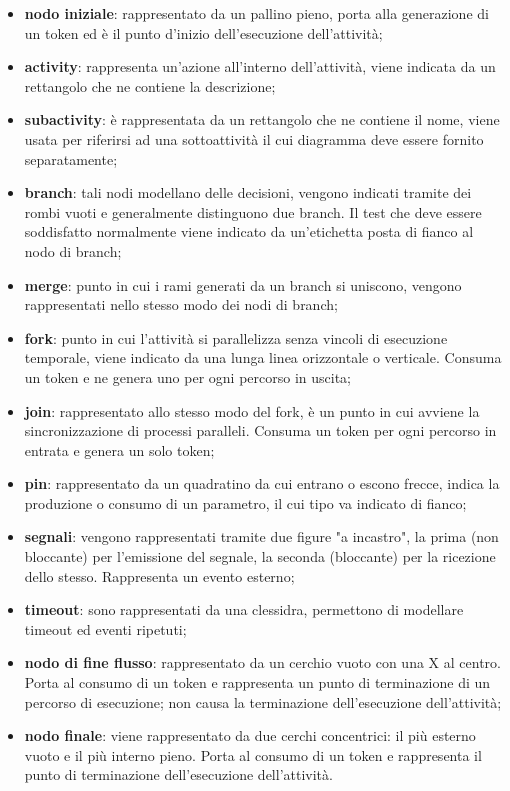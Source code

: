     	\begin{itemize}
    		\item{\textbf{nodo iniziale}}: rappresentato da un pallino pieno, porta alla generazione di un token ed è il punto d'inizio dell'esecuzione dell'attività; 
    		\item{\textbf{activity}}: rappresenta un'azione all'interno dell'attività, viene indicata  da un rettangolo che ne contiene la descrizione; 
    		\item{\textbf{subactivity}}: è rappresentata da un rettangolo che ne contiene il nome, viene usata per riferirsi ad una sottoattività il cui diagramma deve essere fornito separatamente; 
    		\item{\textbf{branch}}: tali nodi modellano delle decisioni, vengono indicati tramite dei rombi vuoti e generalmente distinguono due branch. Il test che deve essere soddisfatto normalmente viene indicato da un'etichetta posta di fianco al nodo di branch; 
    		\item{\textbf{merge}}: punto in cui i rami generati da un branch si uniscono, vengono rappresentati nello stesso modo dei nodi di branch; 
    		\item{\textbf{fork}}: punto in cui l'attività si parallelizza senza vincoli di esecuzione temporale, viene indicato da una lunga linea orizzontale o verticale. Consuma un token e ne genera uno per ogni percorso in uscita;  
    		\item{\textbf{join}}: rappresentato allo stesso modo del fork, è un punto in cui avviene la sincronizzazione di processi paralleli. Consuma un token per ogni percorso in entrata e genera un solo token; 
    		\item{\textbf{pin}}: rappresentato da un quadratino da cui entrano o escono frecce, indica la produzione o consumo di un parametro, il cui tipo va indicato di fianco;
    		\item{\textbf{segnali}}: vengono rappresentati tramite due figure "a incastro", la prima (non bloccante) per l'emissione del segnale, la seconda (bloccante) per la ricezione dello stesso. Rappresenta un evento esterno;
    		\item{\textbf{timeout}}: sono rappresentati da una clessidra, permettono di modellare timeout ed eventi ripetuti;
    		\item{\textbf{nodo di fine flusso}}: rappresentato da un cerchio vuoto con una X al centro. Porta al consumo di un token e rappresenta un punto di terminazione di un percorso di esecuzione; non causa la terminazione dell'esecuzione dell'attività; 
    		\item{\textbf{nodo finale}}: viene rappresentato da due cerchi concentrici: il più esterno vuoto e il più interno pieno. Porta al consumo di un token e rappresenta il punto di terminazione dell'esecuzione dell'attività. 
    	\end{itemize}
    	
